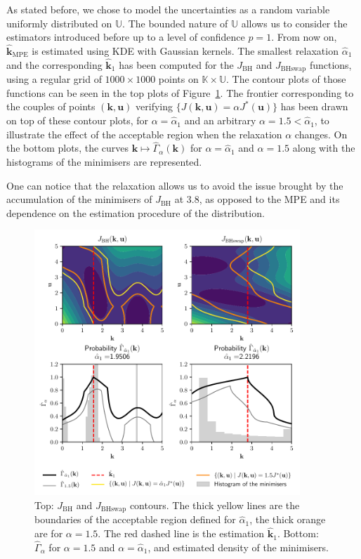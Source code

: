 \documentclass[preprint, 1p]{elsarticle}
\newcommand{\hatkmpe}{\hat{\mathbf{k}}_{\mathrm{MPE}}}
\newcommand{\checka}{{\alpha}}
\newcommand{\checkk}{\mathbf{k}}
\newcommand{\Kspace}{\mathbb{K}}
\newcommand{\Uspace}{\mathbb{U}}
\newcommand{\JBH}{J_{\mathrm{BH}}}
\begin{document}
As stated before, we chose to model the uncertainties as a random variable uniformly distributed on $\Uspace$. The bounded nature of $\Uspace$ allows us to consider the estimators introduced before up to a level of confidence $p=1$.
From now on, $\hatkmpe$ is estimated using KDE with Gaussian kernels.
The smallest relaxation $\hat{\checka}_1$ and the corresponding $\hat{\checkk}_1$ has been computed for the $J_{\mathrm{BH}}$ and $J_{\mathrm{BHswap}}$ functions, using a regular grid of $1000 \times 1000$ points on $\Kspace\times\Uspace$. The contour plots of those functions can be seen in the top plots of Figure~\ref{fig:contour_alpha}. The frontier corresponding to the couples of points $(\mathbf{k},\mathbf{u})$ verifying $\{J(\mathbf{k},\mathbf{u}) = \alpha J^*(\mathbf{u})\}$ has been drawn on top of these contour plots, for $\alpha=\hat{\checka}_1$ and an arbitrary $\alpha=1.5<\hat{\checka}_1$, to illustrate the effect of the acceptable region when the relaxation $\alpha$ changes. 
On the bottom plots, the curves $\mathbf{k}\mapsto \hat{\Gamma}_{\alpha}(\mathbf{k})$ for $\alpha=\hat{\checka}_1$ and $\alpha=1.5$ along with the histograms of the minimisers are represented.


One can notice that the relaxation allows us to avoid the issue brought by the accumulation of the minimisers of $\JBH$ at $3.8$, as opposed to the MPE and its dependence on the estimation procedure of the distribution.

\begin{figure}[!ht]
  \centering
\includegraphics[width=10cm]{Figures/branin_side_66_relax_gamma_both.pdf}
\caption{Top: $J_{\mathrm{BH}}$ and $J_{\mathrm{BHswap}}$ contours. The thick yellow lines are the boundaries of the acceptable region defined for $\hat{\checka}_1$, the thick orange are for $\alpha=1.5$. The red dashed line is the estimation $\hat{\checkk}_1$. Bottom: $\hat{\Gamma}_{\alpha}$ for $\alpha = 1.5$ and $\alpha=\hat{\checka}_1$, and estimated density of the minimisers.}
\label{fig:contour_alpha}
\end{figure}
\end{document}
